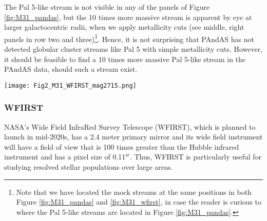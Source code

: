\documentclass[twocolumn]{aastex62}
\newcommand{\todo}[1]{{\color{red} TODO: #1}}
\begin{document}
The Pal 5-like stream is not visible in any of the panels of Figure \ref{fig:M31_pandas}, but the 10 times more massive stream is apparent by eye at larger galactocentric radii, when we apply metallicity cuts (see middle, right panels in row two and three)\footnote{Note that we have located the mock streams at the same positions in both Figure \ref{fig:M31_pandas} and \ref{fig:M31_wfirst}, in case the reader is curious to where the Pal 5-like streams are located in Figure  \ref{fig:M31_pandas}.}. Hence, it is not surprising that PAndAS has not detected globular cluster streams like Pal 5 with simple metallicity cuts. However, it should be feasible to find a 10 times more massive Pal 5-like stream in the PAndAS data, should such a stream exist.

\begin{figure*}
\centerline{\texttt{[image: Fig2\_M31\_WFIRST\_mag2715.png]}}
\caption{{\bf Cold streams in M31 - with WFIRST}. \todo{Need to update background to what WFIRST will see}. This Figure shows the same panels as Figure \ref{fig:M31_pandas}, we have now, however, determine the number of stars in each mock stream by summing up the cumulative number of stars in the streams at the limiting magnitude of WFIRST ($Z068 < 27.15$) at the distance of M31 (see Figure \ref{fig:iso_cfht}, botoom, right panel). Thus, there are 1519 stars in the more massive stream and 148 stars in Pal 5-like stream. At each $R_{GC}$, we have updated the width and lengths of the streams based on the tidal field they experience at these distances (see Section \ref{sec:length}). Additionally, we have updated the number of stars in each field such to illustrate what WFIRST will observe in M31 given WFIRST's  deeper limiting magnitude (see details in Section \ref{sec:WFIRST}).
We note that both the Pal 5-like at the ten times more massive stream are visible in most panels.}
\label{fig:M31_wfirst}
\end{figure*}


\subsubsection{WFIRST}
\label{sec:WFIRST}
NASA's Wide Field InfraRed Survey Telescope (WFIRST), which is planned to launch in mid-2020s, has a 2.4 meter primary mirror and its wide field instrument will have a field of view that is 100 times greater than the Hubble infrared instrument and has a pixel size of 0.11$\mbox{$^{\prime\prime}$}$. Thus, WFIRST is particularly useful for studying resolved stellar populations over large areas. 
\end{document}

